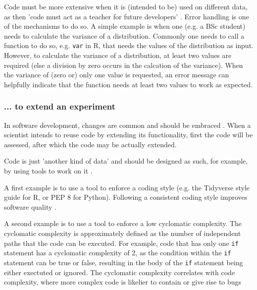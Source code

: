 Code must be more extensive when it is (intended to be) 
used on different data,
as then 'code must act as a teacher for future developers' \cite{sadowski2018modern}.
Error handling is one of the mechanisms to do so.
A simple example is when one (e.g. a BSc student) 
needs to calculate the variance of a distribution.
Commonly one needs to call a function to do so, 
e.g. \verb|var| in R, that needs the values of the distribution
as input.
However, to calculate the variance of a distribution, at least two values
are required (else a division by zero occurs in the calcation of the variance). 
When the variance of (zero or) only one value is requested,
an error message can helpfully indicate that the function 
needs at least two values to work as expected.

\subsubsection{... to extend an experiment}

In software development, 
changes are common and should be embraced \cite{beck2000extreme}.
When a scientist intends to reuse code by extending its functionality,
first the code will be assessed,
after which the code may be actually extended.

Code is just 'another kind of data' and should be designed 
as such, for example, by using tools to work on it \cite{wilson2022twelve}.


A first example is to use a tool to enforce a coding style 
(e.g. the Tidyverse style guide \cite{wickham2019advanced} for R,
or PEP 8 \cite{van2001pep} for Python).
Following a consistent coding style improves software quality \cite{fang2001}.


A second example is to use a tool to enforce a low cyclomatic complexity.
The cyclomatic complexity is approximately defined 
as the number of independent paths that
the code can be executed. 
For example, code that has only one \verb|if| statement
has a cyclomatic complexity of 2, as the condition within the \verb|if|
statement can be true or false,
resulting in the body of the \verb|if| statement being either
exectuted or ignored.
The cyclomatic complexity correlates with code complexity,
where more complex code is likelier to contain or give rise to bugs 
\cite{abd2018calculating,chen2019empirical,zimmermann2008predicting}

